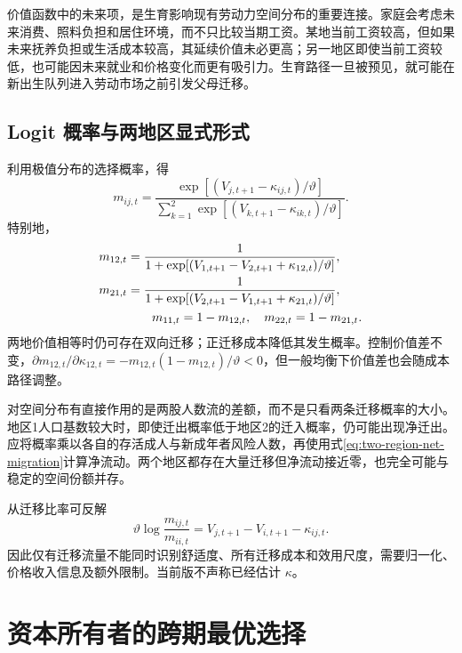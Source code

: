 \documentclass[UTF8,a4paper,zihao=-4,fontset=windows]{ctexart}
\numberwithin{equation}{section}
\begin{document}
价值函数中的未来项，是生育影响现有劳动力空间分布的重要连接。家庭会考虑未来消费、照料负担和居住环境，而不只比较当期工资。某地当前工资较高，但如果未来抚养负担或生活成本较高，其延续价值未必更高；另一地区即使当前工资较低，也可能因未来就业和价格变化而更有吸引力。生育路径一旦被预见，就可能在新出生队列进入劳动市场之前引发父母迁移。

\subsection{Logit 概率与两地区显式形式}
利用极值分布的选择概率，得
\begin{equation}
 m_{ij,t}=\frac{\exp[(V_{j,t+1}-\kappa_{ij,t})/\vartheta]}
 {\sum_{k=1}^2\exp[(V_{k,t+1}-\kappa_{ik,t})/\vartheta]}.
 \label{eq:migration-share}
\end{equation}
特别地，
\begin{align}
 m_{12,t}&=\frac{1}{1+\exp[(V_{1,t+1}-V_{2,t+1}+\kappa_{12,t})/\vartheta]},\\
 m_{21,t}&=\frac{1}{1+\exp[(V_{2,t+1}-V_{1,t+1}+\kappa_{21,t})/\vartheta]},
 \notag\\
 &\qquad m_{11,t}=1-m_{12,t},\quad m_{22,t}=1-m_{21,t}.
 \label{eq:two-region-migration}
\end{align}
两地价值相等时仍可存在双向迁移；正迁移成本降低其发生概率。控制价值差不变，$\partial m_{12,t}/\partial\kappa_{12,t}=-m_{12,t}(1-m_{12,t})/\vartheta<0$，但一般均衡下价值差也会随成本路径调整。

对空间分布有直接作用的是两股人数流的差额，而不是只看两条迁移概率的大小。地区1人口基数较大时，即使迁出概率低于地区2的迁入概率，仍可能出现净迁出。应将概率乘以各自的存活成人与新成年者风险人数，再使用式\eqref{eq:two-region-net-migration}计算净流动。两个地区都存在大量迁移但净流动接近零，也完全可能与稳定的空间份额并存。

从迁移比率可反解
\begin{equation}
 \vartheta\log\frac{m_{ij,t}}{m_{ii,t}}
 =V_{j,t+1}-V_{i,t+1}-\kappa_{ij,t}.
 \label{eq:migration-identification}
\end{equation}
因此仅有迁移流量不能同时识别舒适度、所有迁移成本和效用尺度，需要归一化、价格收入信息及额外限制。当前版不声称已经估计 $\kappa$。

\section{资本所有者的跨期最优选择}
\label{sec:capital}
\end{document}
